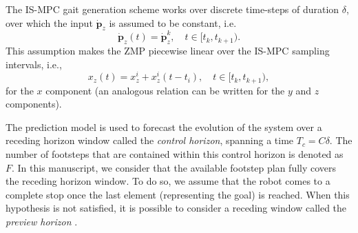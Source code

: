 The IS-MPC gait generation scheme works over discrete time-steps of duration
$\delta$, over which the input $\dot{\bm{p}}_z$ is assumed to be constant, i.e.
\begin{equation*}
    \dot{\bm{p}}_z(t) = \dot{\bm{p}}_z^k,\quad t \in [t_k, t_{k+1}).
\end{equation*}
This assumption makes the ZMP piecewise linear over the IS-MPC sampling intervals,
i.e.,
\begin{equation}
    \label{eq:piecewise-linear-ZMP}
    x_z(t) = x_z^i + x_z^i (t - t_i), \quad t \in [t_k, t_{k+1}),
\end{equation}
for the $x$ component (an analogous relation can be written for the $y$ and $z$
components).

The prediction model is used to forecast the
evolution of the system over a receding horizon window called the
\textit{control horizon}, spanning a time $T_c=C\delta$.
The number of footsteps that are contained
within this control horizon is denoted as $F$. In this manuscript, we consider
that the available footstep plan fully covers the receding horizon window. To
do so, we assume that the robot comes to a complete stop once the
last element (representing the goal) is reached.
When this hypothesis is not satisfied, it is possible to consider a 
receding window called the \textit{preview horizon} \cite{Scianca2020TRO}.

